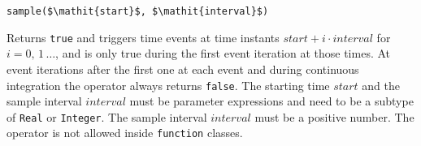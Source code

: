 \begin{operatordefinition*}[sample]\label{modelica:event-sample}
\begin{synopsis}\begin{lstlisting}
sample($\mathit{start}$, $\mathit{interval}$)
\end{lstlisting}\end{synopsis}
\begin{semantics}
Returns \lstinline!true! and triggers time events at time instants $\mathit{start} + i \cdot \mathit{interval}$ for $i = 0,\, 1\, \ldots$, and is only true during the first event iteration at those times.
At event iterations after the first one at each event and during continuous integration the operator always returns \lstinline!false!.
The starting time $\mathit{start}$ and the sample interval $\mathit{interval}$ must be parameter expressions and need to be a subtype of \lstinline!Real! or \lstinline!Integer!.
The sample interval $\mathit{interval}$ must be a positive number.
The operator is not allowed inside \lstinline!function! classes.
\end{semantics}
\end{operatordefinition*}

